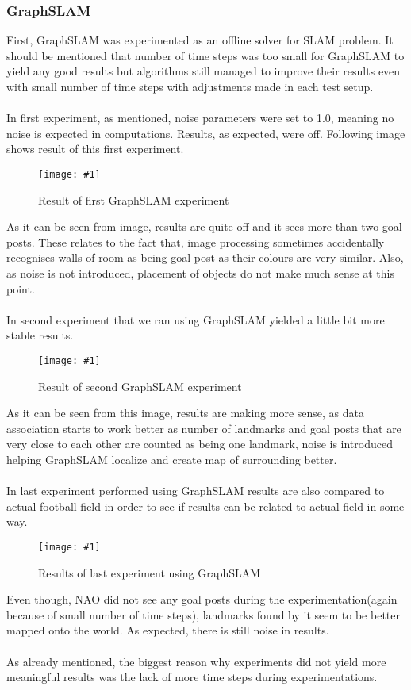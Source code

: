 \documentclass{ba-kecs}
\numberwithin{figure}{section}
\numberwithin{equation}{section}
\newcommand{\dkepic}[2]{ %
	\begin{figure}[H] %
	\texttt{[image: \#1]}
	\caption{#2}
	\label{#1}
	\end{figure}
}
\begin{document}
\subsubsection{GraphSLAM}
First, GraphSLAM was experimented as an offline solver for SLAM problem. It should be mentioned that number of time steps was too small for GraphSLAM to yield any good results but algorithms still managed to improve their results even with small number of time steps with adjustments made in each test setup.\\ \\ 
In first experiment, as mentioned, noise parameters were set to 1.0, meaning no noise is expected in computations. Results, as expected, were off. Following image shows result of this first experiment.
\dkepic{1graphoffline}{Result of first GraphSLAM experiment}
As it can be seen from image, results are quite off and it sees more than two goal posts. These relates to the fact that, image processing sometimes accidentally recognises walls of room as being goal post as their colours are very similar. Also, as noise is not introduced, placement of objects do not make much sense at this point.\\ \\
In second experiment that we ran using GraphSLAM yielded a little bit more stable results.
\dkepic{4graphoffline}{Result of second GraphSLAM experiment}
As it can be seen from this image, results are making more sense, as data association starts to work better as number of landmarks and goal posts that are very close to each other are counted as being one landmark, noise is introduced helping GraphSLAM localize and create map of surrounding better.\\ \\

In last experiment performed using GraphSLAM results are also compared to actual football field in order to see if results can be related to actual field in some way.
\dkepic{7graphoffline}{Results of last experiment using GraphSLAM}
Even though, NAO did not see any goal posts during the experimentation(again because of small number of time steps), landmarks found by it seem to be better mapped onto the world. As expected, there is still noise in results.\\ \\

As already mentioned, the biggest reason why experiments did not yield more meaningful results was the lack of more time steps during experimentations.
\end{document}
